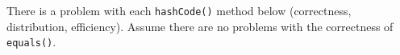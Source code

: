 There is a problem with each \lstinline$hashCode()$ method below (correctness, distribution, efficiency). Assume there are no problems with the correctness of
\lstinline$equals()$.
